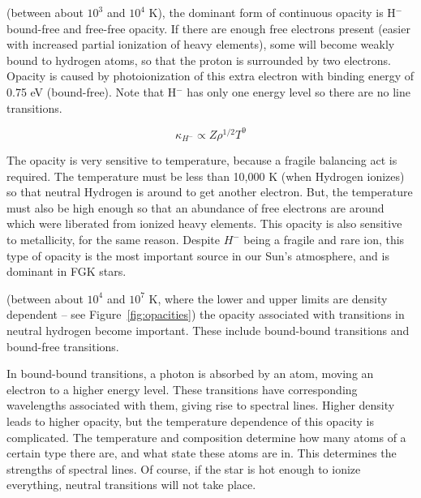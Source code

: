\begin{enumerate}
       (between about $10^3$ and $10^4$ K),
      the dominant form of continuous opacity is H$^-$ bound-free and free-free opacity.
      If there are enough free electrons present (easier with increased partial ionization of
      heavy elements), some will become weakly bound to hydrogen atoms, so that the proton is
      surrounded by two electrons. Opacity is caused by photoionization of this extra electron
      with binding energy of 0.75 eV (bound-free).
      Note that H$^-$ has only one energy level so there are no line transitions.

      \begin{equation}\boxed{
      \kappa_{H^{-}} \propto Z \rho^{1/2} T^{9}
      }\end{equation}
      
      The opacity is very sensitive to temperature, because a fragile balancing act is required.
      The temperature must be less than 10,000 K (when Hydrogen ionizes) so that neutral Hydrogen
      is around to get another electron. But, the temperature must also be high enough so that
      an abundance of free electrons are around which were liberated from ionized heavy elements.
      This opacity is also sensitive to metallicity, for the same reason. 
      Despite $H^{-}$ being a fragile and rare ion, this type of opacity is the most important
      source in our Sun's atmosphere, and is dominant in FGK stars.

       (between about $10^4$ and $10^7$ K, where
      the lower and upper limits are density dependent --
      see Figure~\ref{fig:opacities}) the opacity associated with transitions in
      neutral hydrogen become important.
      These include bound-bound transitions and bound-free transitions.
      
      In bound-bound 
      transitions, a photon is absorbed by an atom, moving an electron to a higher energy level.  
      These transitions have corresponding wavelengths associated with them, giving rise 
      to spectral lines.  Higher density leads to higher opacity, but the temperature 
      dependence of this opacity is complicated.  The temperature and composition determine 
      how many atoms of a certain type there are, and what state these atoms are in.  This 
      determines the strengths of spectral lines.  Of course, if the star is hot enough to 
      ionize everything, neutral transitions will not take place.
      

\end{enumerate}
